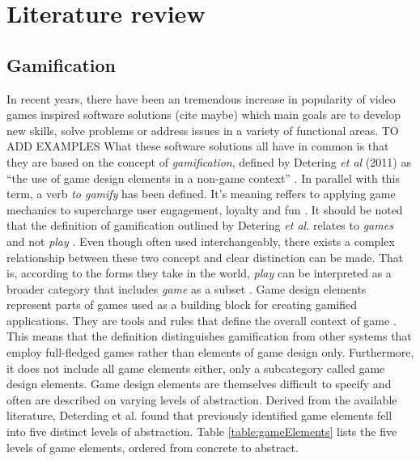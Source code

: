 \chapter{Literature review}\label{chapter:gamification}


\section{Gamification}

In recent years, there have been an tremendous increase in popularity of video games inspired software solutions (cite maybe) which main goals are to develop new skills, solve problems or address issues in a variety of functional areas. TO ADD EXAMPLES What these software solutions all have in common is that they are based on the concept of \textit{gamification}, defined by Detering \textit{et al} (2011) as ``the use of game design elements in a non-game context''  \cite{deterding2011game}. In parallel with this term, a verb \textit{to gamify} has been defined. It's meaning reffers to applying game mechanics to supercharge user engagement, loyalty and fun \cite{toGamify}. It should be noted that the definition of gamification outlined by Detering \textit{et al.} relates to \textit{games} and not \textit{play} \cite{deterding2011game}. Even though often used interchangeably, there exists a complex relationship between these two concept and clear distinction can be made. That is, according to the forms they take in the world, \textit{play} can be interpreted as a broader category that includes \textit{game} as a subset \cite{salen2004rules}. 
Game design elements represent parts of games used as a building block for creating gamified applications. They are tools and rules that define the overall context of game \cite{gamDesElem}. This means that the definition distinguishes gamification from other systems that employ full-fledged games rather than elements of game design only. Furthermore, it does not include all game elements either, only a subcategory called game design elements. %
Game design elements are themselves difficult to specify and often are described on varying levels of abstraction. Derived from the available literature, Deterding et al. found that previously identified game elements fell into five distinct levels of abstraction. Table \ref{table:gameElements} lists the five levels of game elements, ordered from concrete to abstract.
